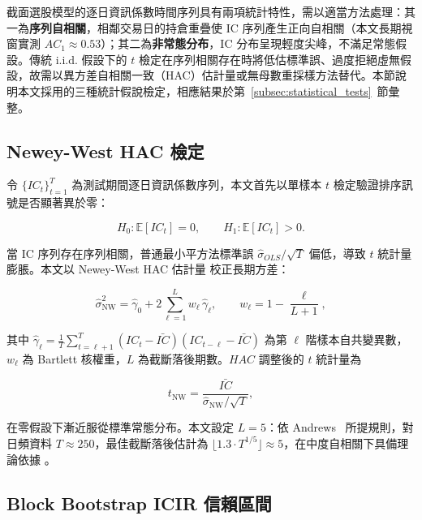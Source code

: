截面選股模型的逐日資訊係數時間序列具有兩項統計特性，需以適當方法處理：其一為\textbf{序列自相關}，相鄰交易日的持倉重疊使 IC 序列產生正向自相關（本文長期視窗實測 $AC_1 \approx 0.53$）；其二為\textbf{非常態分布}，IC 分布呈現輕度尖峰，不滿足常態假設。傳統 i.i.d. 假設下的 $t$ 檢定在序列相關存在時將低估標準誤、過度拒絕虛無假設，故需以異方差自相關一致（HAC）估計量或無母數重採樣方法替代。本節說明本文採用的三種統計假說檢定，相應結果於第~\ref{subsec:statistical_tests}~節彙整。

\subsection{Newey-West HAC  檢定}
\label{subsec:nw_ttest}

令 $\{IC_t\}_{t=1}^{T}$ 為測試期間逐日資訊係數序列，本文首先以單樣本 $t$ 檢定驗證排序訊號是否顯著異於零：

\begin{equation}
H_0: \mathbb{E}[IC_t] = 0, \qquad H_1: \mathbb{E}[IC_t] > 0.
\end{equation}

當 IC 序列存在序列相關，普通最小平方法標準誤 $\hat{\sigma}_{OLS}/\sqrt{T}$ 偏低，導致 $t$ 統計量膨脹。本文以 Newey-West HAC 估計量 \cite{newey1987simple} 校正長期方差：

\begin{equation}
\hat{\sigma}^2_{\mathrm{NW}} = \hat{\gamma}_0 + 2\sum_{\ell=1}^{L} w_\ell \, \hat{\gamma}_\ell, \qquad w_\ell = 1 - \frac{\ell}{L+1},
\end{equation}

其中 $\hat{\gamma}_\ell = \frac{1}{T}\sum_{t=\ell+1}^{T}(IC_t - \bar{IC})(IC_{t-\ell} - \bar{IC})$ 為第 $\ell$ 階樣本自共變異數，$w_\ell$ 為 Bartlett 核權重，$L$ 為截斷落後期數。$HAC$ 調整後的 $t$ 統計量為

\begin{equation}
t_{\mathrm{NW}} = \frac{\bar{IC}}{\hat{\sigma}_{\mathrm{NW}} / \sqrt{T}},
\end{equation}

在零假設下漸近服從標準常態分布。本文設定 $L = 5$：依 Andrews~\cite{andrews1991autocovariance} 所提規則，對日頻資料 $T \approx 250$，最佳截斷落後估計為 $\lfloor 1.3 \cdot T^{1/5} \rfloor \approx 5$，在中度自相關下具備理論依據 \cite{newey1994automatic}。

\subsection{Block Bootstrap ICIR 信賴區間}
\label{subsec:block_bootstrap}

